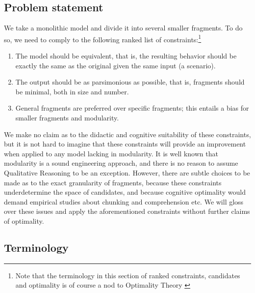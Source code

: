 \documentclass{article} %
\begin{document}
\subsection{Problem statement}

We take a monolithic model and divide it into several smaller fragments. To do
so, we need to comply to the following ranked list of
constraints:\footnote{Note that the terminology in this section of ranked
constraints, candidates and optimality is of course a nod to Optimality
Theory \cite{princesmolensky}}

\begin{enumerate}
\item The model should be equivalent, that is, the resulting behavior should
	be exactly the same as the original given the same input (a scenario).

\item The output should be as parsimonious as possible, that is, fragments
	should be minimal, both in size and number.

\item General fragments are preferred over specific fragments; this entails a
	bias for smaller fragments and modularity.

\end{enumerate}

We make no claim as to the didactic and cognitive suitability of these
constraints, but it is not hard to imagine that these constraints will provide
an improvement when applied to any model lacking in modularity. It is well
known that modularity is a sound engineering approach, and there is no reason
to assume Qualitative Reasoning to be an exception. However, there are subtle
choices to be made as to the exact granularity of fragments, because these
constraints underdetermine the space of candidates, and because cognitive
optimality would demand empirical studies about chunking and comprehension
etc. We will gloss over these issues and apply the aforementioned constraints
without further claims of optimality.

\subsection{Terminology}
\end{document}
